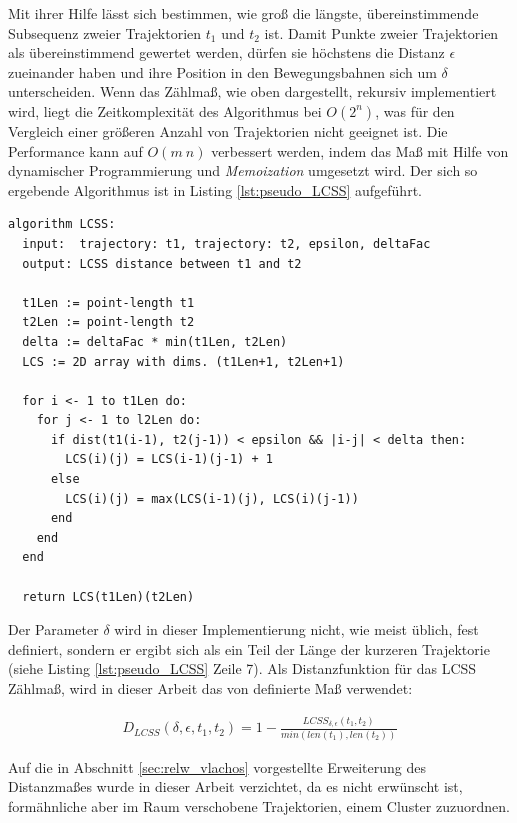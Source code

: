 Mit ihrer Hilfe lässt sich bestimmen, wie groß die längste, übereinstimmende Subsequenz zweier Trajektorien
$t_1$ und $t_2$ ist. Damit Punkte zweier Trajektorien als übereinstimmend gewertet werden, dürfen sie
höchstens die Distanz $\epsilon$ zueinander haben und ihre Position in den Bewegungsbahnen sich um $\delta$
unterscheiden.
Wenn das Zählmaß, wie oben dargestellt, rekursiv implementiert wird, liegt die Zeitkomplexität des Algorithmus
bei $O(2^n)$, was für den Vergleich einer größeren Anzahl von Trajektorien nicht geeignet ist. Die Performance
kann auf $O(m\ n)$ verbessert werden, indem das Maß mit Hilfe von dynamischer Programmierung und \textit{Memoization}
umgesetzt wird. Der sich so ergebende Algorithmus ist in Listing \ref{lst:pseudo_LCSS} aufgeführt.
\begin{lstlisting}[caption=Pseudocode LCSS Bestimmung, language=Pseudo, label=lst:pseudo_LCSS] 
algorithm LCSS:
  input:  trajectory: t1, trajectory: t2, epsilon, deltaFac
  output: LCSS distance between t1 and t2

  t1Len := point-length t1
  t2Len := point-length t2
  delta := deltaFac * min(t1Len, t2Len)
  LCS := 2D array with dims. (t1Len+1, t2Len+1)

  for i <- 1 to t1Len do:
    for j <- 1 to l2Len do:
      if dist(t1(i-1), t2(j-1)) < epsilon && |i-j| < delta then:
        LCS(i)(j) = LCS(i-1)(j-1) + 1
      else
        LCS(i)(j) = max(LCS(i-1)(j), LCS(i)(j-1))
      end
    end
  end

  return LCS(t1Len)(t2Len)
\end{lstlisting}

Der Parameter $\delta$ wird in dieser Implementierung nicht, wie meist üblich, fest definiert, sondern er ergibt sich als
ein Teil der Länge der kurzeren Trajektorie (siehe Listing \ref{lst:pseudo_LCSS} Zeile 7).
Als Distanzfunktion für das LCSS Zählmaß, wird in dieser Arbeit das von \cite[]{Vlachos2002} definierte
Maß verwendet:

\begin{ceqn}
\begin{align*}
    D_{LCSS}(\delta, \epsilon, t_1, t_2) = 1 - \frac{LCSS_{\delta, \epsilon}(t_1, t_2)}{min(len(t_1), len(t_2))}
\end{align*}
\end{ceqn}

Auf die in Abschnitt \ref{sec:relw_vlachos} vorgestellte Erweiterung des Distanzmaßes wurde in dieser Arbeit verzichtet,
da es nicht erwünscht ist, formähnliche aber im Raum verschobene Trajektorien, einem Cluster zuzuordnen.

